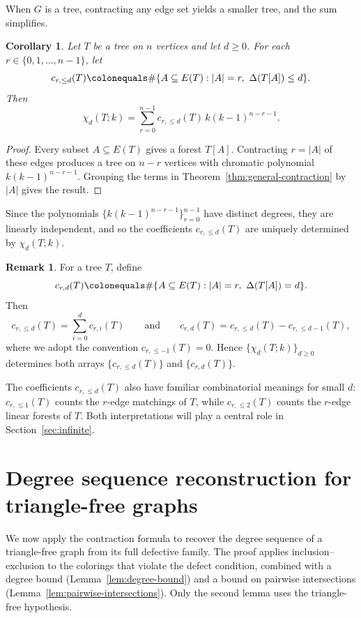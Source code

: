 \documentclass[12pt,reqno]{amsart}
\newtheorem{cor}[thm]{Corollary}
\theoremstyle{definition}
\newtheorem{rmk}[thm]{Remark}
\begin{document}
When $G$ is a tree, contracting any edge set yields a smaller tree, and the sum simplifies.

\begin{cor}\label{cor:tree-expansion}
Let $T$ be a tree on $n$ vertices and let $d\geq 0$. For each $r\in \{0,1,\dots,n-1\}$, let
\[
c_{r,\leq d}(T)\colonequals \#\{A\subseteq E(T) : |A|=r,\ \Delta(T[A])\leq d\}.
\]
Then
\[
\chi_d(T;k)=\sum_{r=0}^{n-1} c_{r,\leq d}(T)\,k(k-1)^{n-r-1}.
\]
\end{cor}

\begin{proof}
Every subset $A\subseteq E(T)$ gives a forest $T[A]$. Contracting $r=|A|$ of these edges produces a tree on $n-r$ vertices with chromatic polynomial $k(k-1)^{n-r-1}$. Grouping the terms in Theorem~\ref{thm:general-contraction} by $|A|$ gives the result.
\end{proof}

Since the polynomials $\{k(k-1)^{n-r-1}\}_{r=0}^{n-1}$ have distinct degrees, they are linearly independent, and so the coefficients $c_{r,\leq d}(T)$ are uniquely determined by $\chi_d(T;k)$.

\begin{rmk}\label{rmk:extraction}
For a tree $T$, define 
\[
c_{r,d}(T)\colonequals \#\{A\subseteq E(T) : |A|=r,\ \Delta(T[A])=d\}.
\]
Then
\[
c_{r,\leq d}(T)=\sum_{i=0}^d c_{r,i}(T)
\qquad\text{and}\qquad
c_{r,d}(T)=c_{r,\leq d}(T)-c_{r,\leq d-1}(T),
\]
where we adopt the convention $c_{r,\leq -1}(T)=0$. Hence $\{\chi_d(T;k)\}_{d\geq 0}$ determines both arrays $\{c_{r,\leq d}(T)\}$ and $\{c_{r,d}(T)\}$.
\end{rmk}

The coefficients $c_{r,\leq d}(T)$ also have familiar combinatorial meanings for small $d$: $c_{r,\leq 1}(T)$ counts the $r$-edge matchings of $T$, while $c_{r,\leq 2}(T)$ counts the $r$-edge linear forests of $T$. Both interpretations will play a central role in Section~\ref{sec:infinite}.

\section{Degree sequence reconstruction for triangle-free graphs}\label{sec:degree-sequence}

We now apply the contraction formula to recover the degree sequence of a triangle-free graph from its full defective family. The proof applies inclusion--exclusion to the colorings that violate the defect condition, combined with a degree bound (Lemma~\ref{lem:degree-bound}) and a bound on pairwise intersections (Lemma~\ref{lem:pairwise-intersections}). Only the second lemma uses the triangle-free hypothesis.
\end{document}
